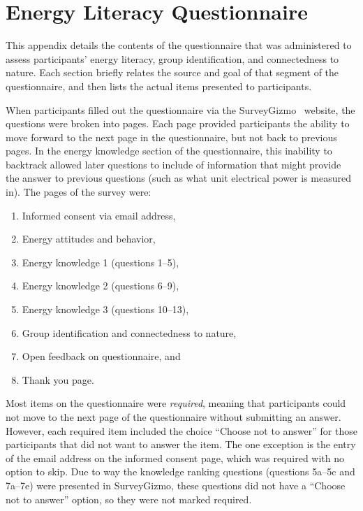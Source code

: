 \chapter{Energy Literacy Questionnaire}
\label{app:energy-literacy}

This appendix details the contents of the questionnaire that was administered to assess participants' energy literacy, group identification, and connectedness to nature. Each section briefly relates the source and goal of that segment of the questionnaire, and then lists the actual items presented to participants.

When participants filled out the questionnaire via the SurveyGizmo~\cite{surveygizmo} website, the questions were broken into pages. Each page provided participants the ability to move forward to the next page in the questionnaire, but not back to previous pages. In the energy knowledge section of the questionnaire, this inability to backtrack allowed later questions to include of information that might provide the answer to previous questions (such as what unit electrical power is measured in). The pages of the survey were:

\begin{enumerate}
	\item Informed consent via email address,
	\item Energy attitudes and behavior,
	\item Energy knowledge 1 (questions 1--5),
	\item Energy knowledge 2 (questions 6--9),
	\item Energy knowledge 3 (questions 10--13),
	\item Group identification and connectedness to nature,
	\item Open feedback on questionnaire, and
	\item Thank you page.
\end{enumerate}

Most items on the questionnaire were \emph{required}, meaning that participants could not move to the next page of the questionnaire without submitting an answer. However, each required item included the choice ``Choose not to answer'' for those participants that did not want to answer the item. The one exception is the entry of the email address on the informed consent page, which was required with no option to skip. Due to way the knowledge ranking questions (questions 5a--5c and 7a--7e) were presented in SurveyGizmo, these questions did not have a ``Choose not to answer'' option, so they were not marked required.

